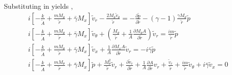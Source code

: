 








Substituting in yields ,%
\begin{align} 
        i\left[ 
            - \frac{k}{\tilde{A}} + 
            \frac{m M_{\theta}}{\tilde{r}} + 
            \bar{\gamma} M_x 
        \right] \tilde{v}_r - 
        \frac{2 M_{\theta} \tilde{v}_{\theta}}{\tilde{r}} = 
        -\frac{\partial \tilde{p}}{\partial \tilde{r}} -
        (\gamma-1)\frac{\gamma M_{\theta}}{\tilde{r}}\tilde{p}\\
        i\left[ - \frac{k}{\tilde{A}} +
        \frac{m M_{\theta}}{\tilde{r}} + \bar{\gamma} M_x \right] 
        \tilde{v}_{\theta} + \left(\frac{ M_{\theta}}{\tilde{r}}  + 
        \frac{1}{A} \frac{\partial M_{\theta}A}{\partial \tilde{r}}\right)
        \tilde{v}_r = \frac{i m}{\tilde{r}}\tilde{p}\\
        i\left[ - \frac{k}{\tilde{A}} + \frac{m M_{\theta}}{\tilde{r}} + 
        \bar{\gamma} M_x \right] \tilde{v}_x  + \frac{1}{A} 
        \frac{\partial M_x A}{\partial \tilde{r}}\tilde{v}_r =
        -i \bar{\gamma}\tilde{p} \\ 
        i \left[ -\frac{k}{\tilde{A}} + 
            \frac{mM_{\theta}}{\tilde{r}} +
        \bar{\gamma}M_x \right] \tilde{p} + 
        \frac{M_{\theta}^2}{\tilde{r}}\tilde{v}_r + 
        \frac{\partial \tilde{v}_r}{\partial \tilde{r}} +
        \frac{1}{A}\frac{\partial A}{\partial \tilde{r}}{v}_r+ 
        \frac{\tilde{v}_r  }{\tilde{r}} + \frac{im}{\tilde{r}}\tilde{v}_\theta + i \bar{\gamma} \tilde{v}_x = 0
\end{align}

